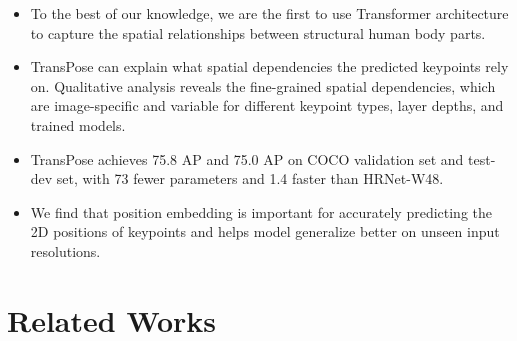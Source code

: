 \documentclass{article}
\begin{document}
\begin{itemize}
	\item To the best of our knowledge, we are the first to use Transformer architecture to capture the spatial relationships between structural human body parts. \vspace*{-0.05in}
	\item TransPose can explain what spatial dependencies the predicted keypoints rely on. Qualitative analysis reveals  the fine-grained spatial dependencies, which are image-specific and variable for different keypoint types, layer depths, and trained models.\vspace*{-0.05in}
	
	\item TransPose achieves 75.8 AP and 75.0 AP on COCO validation set and test-dev set, with 73 fewer parameters and 1.4 faster than HRNet-W48.\vspace*{-0.05in}
	
	\item We find that position embedding is important for accurately predicting the 2D positions of keypoints and helps model generalize better on unseen input resolutions.
\end{itemize}


\section{Related Works}
\end{document}
